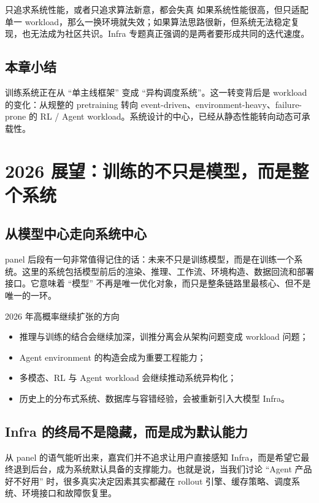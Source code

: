 \documentclass[a4paper]{article}
\begin{document}
\begin{warningbox}{只追求系统性能，或者只追求算法新意，都会失真}
如果系统性能很高，但只适配单一 workload，那么一换环境就失效；如果算法思路很新，但系统无法稳定复现，也无法成为社区共识。Infra 专题真正强调的是两者要形成共同的迭代速度。
\end{warningbox}

\subsection{本章小结}
训练系统正在从 ``单主线框架'' 变成 ``异构调度系统''。这一转变背后是 workload 的变化：从规整的 pretraining 转向 event-driven、environment-heavy、failure-prone 的 RL / Agent workload。系统设计的中心，已经从静态性能转向动态可承载性。

\section{2026 展望：训练的不只是模型，而是整个系统}

\subsection{从模型中心走向系统中心}
panel 后段有一句非常值得记住的话：未来不只是训练模型，而是在训练一个系统。这里的系统包括模型前后的渲染、推理、工作流、环境构造、数据回流和部署接口。它意味着 ``模型'' 不再是唯一优化对象，而只是整条链路里最核心、但不是唯一的一环。

\begin{importantbox}{2026 年高概率继续扩张的方向}
\begin{itemize}
  \item 推理与训练的结合会继续加深，训推分离会从架构问题变成 workload 问题；
  \item Agent environment 的构造会成为重要工程能力；
  \item 多模态、RL 与 Agent workload 会继续推动系统异构化；
  \item 历史上的分布式系统、数据库与容错经验，会被重新引入大模型 Infra。
\end{itemize}
\end{importantbox}

\subsection{Infra 的终局不是隐藏，而是成为默认能力}
从 panel 的语气能听出来，嘉宾们并不追求让用户直接感知 Infra，而是希望它最终退到后台，成为系统默认具备的支撑能力。也就是说，当我们讨论 ``Agent 产品好不好用'' 时，很多真实决定因素其实都藏在 rollout 引擎、缓存策略、调度系统、环境接口和故障恢复里。
\end{document}
